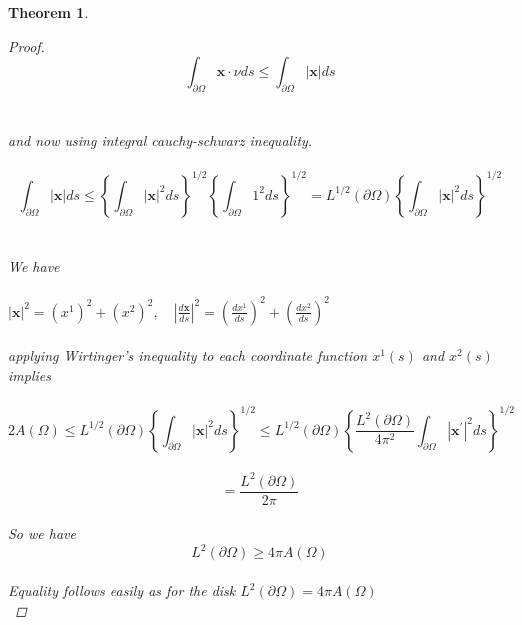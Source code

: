 \documentclass[oneside]{book}
\newtheorem{theorem}{Theorem}[section]
\begin{document}
\begin{theorem}
\begin{proof}
			$$ \int_{\partial \Omega} \mathbf{x} \cdot \nu d s \leq \int_{\partial \Omega} | \mathbf{x}| d s  $$ 
			\\\\
			and now using integral cauchy-schwarz inequality. \\\\
			$$\int_{\partial \Omega}|\mathbf{x}| d s \leq\left\{\int_{\partial \Omega}|\mathbf{x}|^{2} d s\right\}^{1 / 2}\left\{\int_{\partial \Omega} 1^{2} d s\right\}^{1 / 2} =L^{1 / 2}(\partial \Omega)\left\{\int_{\partial \Omega}|\mathbf{x}|^{2} d s\right\}^{1 / 2}$$ \\\\
			We have \\\\
			$|\mathbf{x}|^{2} = \left(x^{1}\right)^{2}+\left(x^{2}\right)^{2}, \quad\left|\frac{d \mathbf{x}}{d s}\right|^{2}=\left(\frac{d x^{1}}{d s}\right)^{2}+\left(\frac{d x^{2}}{d s}\right)^{2}$\\\\
			applying Wirtinger's inequality to each coordinate function $x^{1}(s)$ and $x^{2}(s)$ implies \\\\
			$$ 2 A(\Omega) \leq L^{1 / 2}(\partial \Omega)\left\{\int_{\partial \Omega}|\mathbf{x}|^{2} d s\right\}^{1 / 2} \leq L^{1 / 2}(\partial \Omega)\left\{\frac{L^{2}(\partial \Omega)}{4 \pi^{2}} \int_{\partial \Omega}\left|\mathbf{x}^{\prime}\right|^{2} d s\right\}^{1 / 2}$$
			\\
			$$=\frac{L^{2}(\partial \Omega)}{2 \pi}$$ \\
			So we have $$L^{2}(\partial \Omega) \geq 4 \pi A(\Omega)$$\\
			Equality follows easily as for the disk $L^{2}(\partial \Omega) = 4 \pi A(\Omega)$ \\
			
		\end{proof}
	\end{theorem}
	
	
	
	
	
	
	
	
	
	
\end{document}
